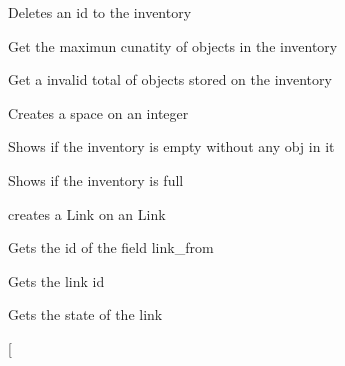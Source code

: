 \begin{DoxyRefList}
\item[\label{test__test000006}%
\Hypertarget{test__test000006}%
Global \hyperlink{inventory__tb_8c_a52850510d17b4f1c105123fdd9e93906}{test2\+\_\+inventory\+\_\+del\+\_\+id} ()]Deletes an id to the inventory  
\item[\label{test__test000010}%
\Hypertarget{test__test000010}%
Global \hyperlink{inventory__tb_8c_abddcab377edb21235d6746668597fde2}{test2\+\_\+inventory\+\_\+get\+\_\+max} ()]Get the maximun cunatity of objects in the inventory  
\item[\label{test__test000012}%
\Hypertarget{test__test000012}%
Global \hyperlink{inventory__tb_8c_aeec52e4144e58ca0d4c45e877082122f}{test2\+\_\+inventory\+\_\+get\+\_\+total} ()]Get a invalid total of objects stored on the inventory  
\item[\label{test__test000008}%
\Hypertarget{test__test000008}%
Global \hyperlink{inventory__tb_8c_a3a90d9e6b5fb0cabdb8608919256805e}{test2\+\_\+inventory\+\_\+has\+\_\+id} ()]Creates a space on an integer  
\item[\label{test__test000016}%
\Hypertarget{test__test000016}%
Global \hyperlink{inventory__tb_8c_a4d2a2a4d4ba59446d013debfe9bf05dc}{test2\+\_\+inventory\+\_\+is\+\_\+empty} ()]Shows if the inventory is empty without any obj in it  
\item[\label{test__test000014}%
\Hypertarget{test__test000014}%
Global \hyperlink{inventory__tb_8c_a1c9e567d4919d5aaccc9580815a8a81d}{test2\+\_\+inventory\+\_\+is\+\_\+full} ()]Shows if the inventory is full  
\item[\label{test__test000018}%
\Hypertarget{test__test000018}%
Global \hyperlink{link__tb_8c_a53e4a13ef85966a6477dcc4215895757}{test2\+\_\+\+Link\+\_\+create} ()]creates a Link on an Link  
\item[\label{test__test000036}%
\Hypertarget{test__test000036}%
Global \hyperlink{link__tb_8c_afa54b50b317cbfd07136184fb4843590}{test2\+\_\+\+Link\+\_\+get\+\_\+from} ()]Gets the id of the field link\+\_\+from  
\item[\label{test__test000032}%
\Hypertarget{test__test000032}%
Global \hyperlink{link__tb_8c_a58a512428194b0f83973b221fceb1b1f}{test2\+\_\+\+Link\+\_\+get\+\_\+id} ()]Gets the link id  
\item[\label{test__test000038}%
\Hypertarget{test__test000038}%
Global \hyperlink{link__tb_8c_a8ac218f6799175e70309dfc8efbbb9b3}{test2\+\_\+\+Link\+\_\+get\+\_\+state} ()]Gets the state of the link  
\item[\label{test__test000034}%
%

\end{DoxyRefList}
